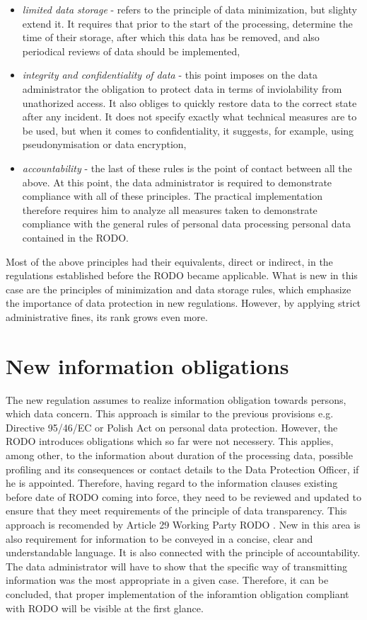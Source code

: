 \documentclass[en, noamssymb]{mgr}
\begin{document}
\begin{itemize}
\item \textit{limited data storage} - refers to the principle of data minimization, but slighty extend it. It requires that prior to the start of the processing, determine the time of their storage, after which this data has be removed, and also periodical reviews of data should be implemented,

\item \textit{integrity and confidentiality of data} - this point imposes on the data administrator the obligation to protect data in terms of inviolability from unathorized access. It also obliges to quickly restore data to the correct state after any incident. It does not specify exactly what technical measures are to be used, but when it comes to confidentiality, it suggests, for example, using pseudonymisation or data encryption,

\item \textit{accountability} - the last of these rules is the point of contact between all the above. At this point, the data administrator is required to demonstrate compliance with all of these principles. The practical implementation therefore requires him to analyze all measures taken to demonstrate compliance with the general rules of personal data processing personal data contained in the RODO.
\end{itemize}

Most of the above principles had their equivalents, direct or indirect, in the regulations established before the RODO became applicable. What is new in this case are the principles of minimization and data storage rules, which emphasize the importance of data protection in new regulations. However, by applying strict administrative fines, its rank grows even more.

\section{New information obligations}

The new regulation assumes to realize information obligation towards persons, which data concern. This approach is similar to the previous provisions e.g. Directive 95/46/EC or Polish Act on personal data protection. However, the RODO introduces obligations which so far were not necessery. This applies, among other, to the information about duration of the processing data, possible profiling and its consequences or contact details to the Data Protection Officer, if he is appointed. Therefore, having regard to the information clauses existing before date of RODO coming into force, they need to be reviewed and updated to ensure that they meet requirements of the principle of data transparency. This approach is recomended by Article 29 Working Party RODO \cite{delloite_inform}. New in this area is also requirement for information to be conveyed in a concise, clear and understandable language. It is also connected with the principle of accountability. The data administrator will have to show that the specific way of transmitting information was the most appropriate in a given case. Therefore, it can be concluded, that proper implementation of the inforamtion obligation compliant with RODO will be visible at the first glance.
\end{document}
